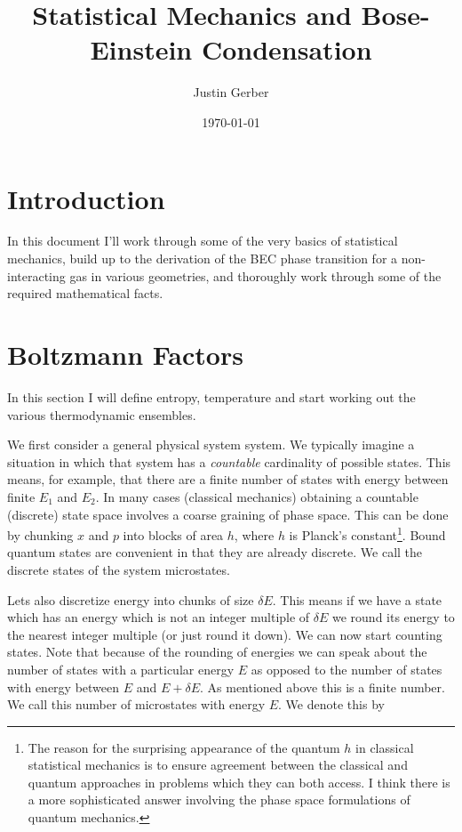 \documentclass[12pt]{article}
\begin{document}
\title{Statistical Mechanics and Bose-Einstein Condensation}
\author{Justin Gerber}
\date{\today}
\maketitle

\section*{Introduction}
In this document I'll work through some of the very basics of statistical mechanics, build up to the derivation of the BEC phase transition for a non-interacting gas in various geometries, and thoroughly work through some of the required mathematical facts.

\section{Boltzmann Factors}

In this section I will define entropy, temperature and start working out the various thermodynamic ensembles.

We first consider a general physical system system. We typically imagine a situation in which that system has a \textit{countable} cardinality of possible states. This means, for example, that there are a finite number of states with energy between finite $E_1$ and $E_2$. In many cases (classical mechanics) obtaining a countable (discrete) state space involves a coarse graining of phase space. This can be done by chunking $x$ and $p$ into blocks of area $h$, where $h$  is Planck's constant\footnote{The reason for the surprising appearance of the quantum $h$ in classical statistical mechanics is to ensure agreement between the classical and quantum approaches in problems which they can both access. I think there is a more sophisticated answer involving the phase space formulations of quantum mechanics.}. Bound quantum states are convenient in that they are already discrete. We call the discrete states of the system microstates.

Lets also discretize energy into chunks of size $\delta E$. This means if we have a state which has an energy which is not an integer multiple of $\delta E$ we round its energy to the nearest integer multiple (or just round it down). We can now start counting states. Note that because of the rounding of energies we can speak about the number of states with a particular energy $E$ as opposed to the number of states with energy between $E$ and $E+\delta E$. As mentioned above this is a finite number. We call this number of microstates with energy $E$. We denote this by
\end{document}
